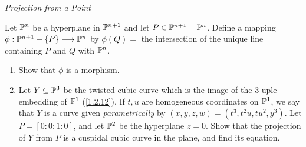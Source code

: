 \label{1.3.14}

\emph{Projection from a Point}

Let $\P^n$ be a hyperplane in $\P^{n+1}$ and let $P \in \P^{n + 1} - \P^n$. Define a mapping $\phi: \P^{n + 1} - \curly{P} \longrightarrow \P^n$ by $\phi(Q) = $ the intersection of the unique line containing $P$ and $Q$ with $\P^n$.

\begin{enumerate}[label=(\alph*)]
    \item Show that $\phi$ is a morphism.

    \item Let $Y \subseteq \P^3$ be the twisted cubic curve which is the image of the $3$-uple embedding of $\P^1$ (\ref{1.2.12}). If $t, u$ are homogeneous coordinates on $\P^1$, we say that $Y$ is a curve given \emph{parametrically} by $(x, y, z, w) = (t^3, t^2 u, t u^2, y^3)$. Let $P = [0 : 0 : 1 : 0]$, and let $\P^2$ be the hyperplane $z = 0$. Show that the projection of $Y$ from $P$ is a cuspidal cubic curve in the plane, and find its equation.
\end{enumerate}


